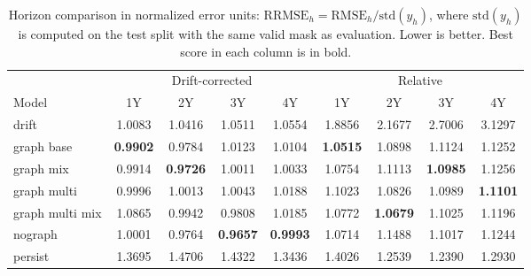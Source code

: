 \documentclass{article}
\begin{document}
\begin{table}[H]
\centering
\caption{Horizon comparison in normalized error units: $\mathrm{RRMSE}_h=\mathrm{RMSE}_h/\mathrm{std}(y_h)$, where $\mathrm{std}(y_h)$ is computed on the test split with the same valid mask as evaluation. Lower is better. Best score in each column is in bold.}
\label{tab:appendix_rrmse_horizon_models}
\small
\setlength{\tabcolsep}{4pt}
\begin{tabular}{lcccccccc}
\toprule
& \multicolumn{4}{c}{Drift-corrected} & \multicolumn{4}{c}{Relative} \\
Model & 1Y & 2Y & 3Y & 4Y & 1Y & 2Y & 3Y & 4Y \\
\midrule
drift & 1.0083 & 1.0416 & 1.0511 & 1.0554 & 1.8856 & 2.1677 & 2.7006 & 3.1297 \\
graph base & \textbf{0.9902} & 0.9784 & 1.0123 & 1.0104 & \textbf{1.0515} & 1.0898 & 1.1124 & 1.1252 \\
graph mix & 0.9914 & \textbf{0.9726} & 1.0011 & 1.0033 & 1.0754 & 1.1113 & \textbf{1.0985} & 1.1256 \\
graph multi & 0.9996 & 1.0013 & 1.0043 & 1.0188 & 1.1023 & 1.0826 & 1.0989 & \textbf{1.1101} \\
graph multi mix & 1.0865 & 0.9942 & 0.9808 & 1.0185 & 1.0772 & \textbf{1.0679} & 1.1025 & 1.1196 \\
nograph & 1.0001 & 0.9764 & \textbf{0.9657} & \textbf{0.9993} & 1.0714 & 1.1488 & 1.1017 & 1.1244 \\
persist & 1.3695 & 1.4706 & 1.4322 & 1.3436 & 1.4026 & 1.2539 & 1.2390 & 1.2930 \\
\bottomrule
\end{tabular}
\end{table}
\end{document}
